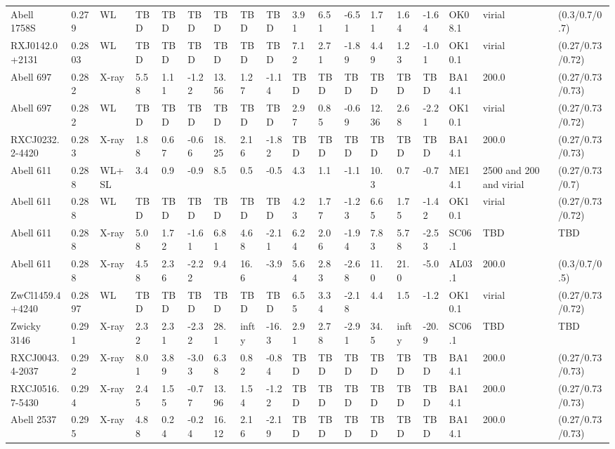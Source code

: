 \documentclass{article}
\begin{document}
\begin{center}
\begin{landscape}
\begin{longtable}{llllllllllllllllll}
Abell 1758S & 0.279 & WL & TBD & TBD & TBD & TBD & TBD & TBD & 3.91 & 6.51 & -6.51 & 1.71 & 1.64 & -1.64 & OK08.1 & virial & (0.3/0.7/0.7) \\
RXJ0142.0+2131 & 0.2803 & WL & TBD & TBD & TBD & TBD & TBD & TBD & 7.12 & 2.71 & -1.89 & 4.49 & 1.23 & -1.01 & OK10.1 & virial & (0.27/0.73/0.72) \\
Abell 697 & 0.282 & X-ray & 5.58 & 1.11 & -1.22 & 13.56 & 1.27 & -1.14 & TBD & TBD & TBD & TBD & TBD & TBD & BA14.1 & 200.0 & (0.27/0.73/0.73) \\
Abell 697 & 0.282 & WL & TBD & TBD & TBD & TBD & TBD & TBD & 2.97 & 0.85 & -0.69 & 12.36 & 2.68 & -2.21 & OK10.1 & virial & (0.27/0.73/0.72) \\
RXCJ0232.2-4420 & 0.283 & X-ray & 1.88 & 0.67 & -0.66 & 18.25 & 2.16 & -1.82 & TBD & TBD & TBD & TBD & TBD & TBD & BA14.1 & 200.0 & (0.27/0.73/0.73) \\
Abell 611 & 0.288 & WL+SL & 3.4 & 0.9 & -0.9 & 8.5 & 0.5 & -0.5 & 4.3 & 1.1 & -1.1 & 10.3 & 0.7 & -0.7 & ME14.1 & 2500 and 200 and virial & (0.27/0.73/0.7) \\
Abell 611 & 0.288 & WL & TBD & TBD & TBD & TBD & TBD & TBD & 4.23 & 1.77 & -1.23 & 6.65 & 1.75 & -1.42 & OK10.1 & virial & (0.27/0.73/0.72) \\
Abell 611 & 0.288 & X-ray & 5.08 & 1.72 & -1.61 & 6.81 & 4.68 & -2.11 & 6.24 & 2.06 & -1.94 & 7.83 & 5.78 & -2.53 & SC06.1 & TBD & TBD \\
Abell 611 & 0.288 & X-ray & 4.58 & 2.36 & -2.22 & 9.4 & 16.6 & -3.9 & 5.64 & 2.83 & -2.68 & 11.0 & 21.0 & -5.0 & AL03.1 & 200.0 & (0.3/0.7/0.5) \\
ZwCl1459.4+4240 & 0.2897 & WL & TBD & TBD & TBD & TBD & TBD & TBD & 6.55 & 3.34 & -2.18 & 4.4 & 1.5 & -1.2 & OK10.1 & virial & (0.27/0.73/0.72) \\
Zwicky 3146 & 0.291 & X-ray & 2.32 & 2.31 & -2.32 & 28.1 & infty & -16.3 & 2.91 & 2.78 & -2.91 & 34.5 & infty & -20.9 & SC06.1 & TBD & TBD \\
RXCJ0043.4-2037 & 0.292 & X-ray & 8.01 & 3.89 & -3.03 & 6.38 & 0.82 & -0.84 & TBD & TBD & TBD & TBD & TBD & TBD & BA14.1 & 200.0 & (0.27/0.73/0.73) \\
RXCJ0516.7-5430 & 0.294 & X-ray & 2.45 & 1.55 & -0.77 & 13.96 & 1.54 & -1.22 & TBD & TBD & TBD & TBD & TBD & TBD & BA14.1 & 200.0 & (0.27/0.73/0.73) \\
Abell 2537 & 0.295 & X-ray & 4.88 & 0.24 & -0.24 & 16.12 & 2.16 & -2.19 & TBD & TBD & TBD & TBD & TBD & TBD & BA14.1 & 200.0 & (0.27/0.73/0.73) \\

\end{longtable}
\end{landscape}
\end{center}
\end{document}
